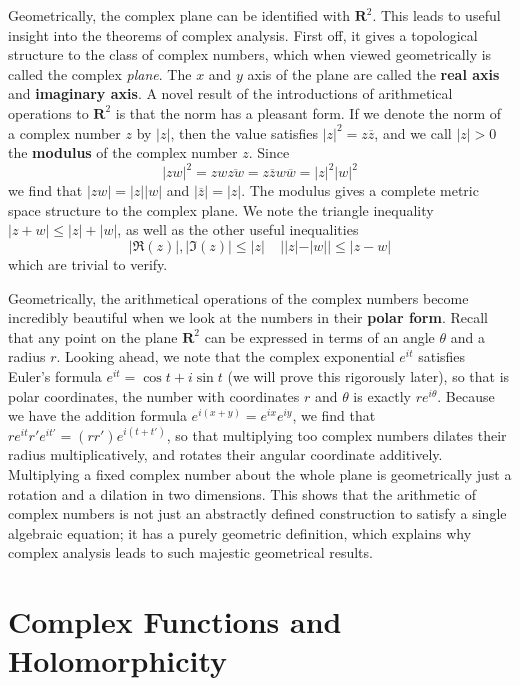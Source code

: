 Geometrically, the complex plane can be identified with $\mathbf{R}^2$. This leads to useful insight into the theorems of complex analysis. First off, it gives a topological structure to the class of complex numbers, which when viewed geometrically is called the complex {\it plane}. The $x$ and $y$ axis of the plane are called the {\bf real axis} and {\bf imaginary axis}. A novel result of the introductions of arithmetical operations to $\mathbf{R}^2$ is that the norm has a pleasant form. If we denote the norm of a complex number $z$ by $|z|$, then the value satisfies $|z|^2 = z\overline{z}$, and we call $|z| > 0$ the {\bf modulus} of the complex number $z$. Since
%
\[ |zw|^2 = zw \overline{zw} = z\overline{z} w \overline{w} = |z|^2|w|^2 \]
%
we find that $|zw| = |z||w|$ and $|\overline{z}| = |z|$. The modulus gives a complete metric space structure to the complex plane. We note the triangle inequality $|z + w| \leq |z| + |w|$, as well as the other useful inequalities
%
\[ |\Re(z)|, |\Im(z)| \leq |z|\ \ \ \ \ ||z| - |w|| \leq |z - w| \]
%
which are trivial to verify.

Geometrically, the arithmetical operations of the complex numbers become incredibly beautiful when we look at the numbers in their {\bf polar form}. Recall that any point on the plane $\mathbf{R}^2$ can be expressed in terms of an angle $\theta$ and a radius $r$. Looking ahead, we note that the complex exponential $e^{it}$ satisfies Euler's formula $e^{it} = \cos t + i \sin t$ (we will prove this rigorously later), so that is polar coordinates, the number with coordinates $r$ and $\theta$ is exactly $re^{i\theta}$. Because we have the addition formula $e^{i(x + y)} = e^{ix}e^{iy}$, we find that $re^{it}r'e^{it'} = (rr')e^{i(t + t')}$, so that multiplying too complex numbers dilates their radius multiplicatively, and rotates their angular coordinate additively. Multiplying a fixed complex number about the whole plane is geometrically just a rotation and a dilation in two dimensions. This shows that the arithmetic of complex numbers is not just an abstractly defined construction to satisfy a single algebraic equation; it has a purely geometric definition, which explains why complex analysis leads to such majestic geometrical results.

\section{Complex Functions and Holomorphicity}

